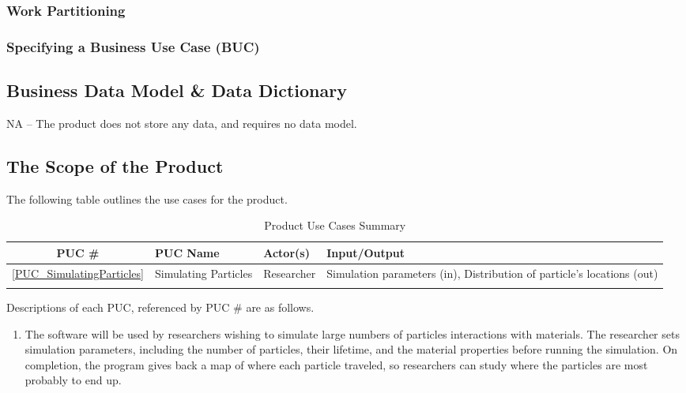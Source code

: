 \documentclass[12pt]{article}
\begin{document}
\subsubsection{Work Partitioning}

\subsubsection{Specifying a Business Use Case (BUC)}

\subsection{Business Data Model \& Data Dictionary} %
NA -- The product does not store any data, and requires no data model.

\subsection{The Scope of the Product}
The following table outlines the use cases for the product.

\begin{table}[h]
\centering
\caption{Product Use Cases Summary}
\begin{tabularx}{\textwidth}{c|l|l|X}
\Xhline{2\arrayrulewidth}
\bf PUC \# & \bf PUC Name & Actor(s) & \bf Input/Output\\
\hline
\ref{PUC_SimulatingParticles} & Simulating Particles & Researcher & Simulation parameters (in), Distribution of particle's locations (out)\\
\Xhline{2\arrayrulewidth}
\end{tabularx}
\end{table}

Descriptions of each PUC, referenced by PUC \# are as follows.
\begin{enumerate}
\item \label{PUC_SimulatingParticles} The software will be used by researchers wishing to simulate large numbers of particles interactions with materials. The researcher sets simulation parameters, including the number of particles, their lifetime, and the material properties before running the simulation. On completion, the program gives back a map of where each particle traveled, so researchers can study where the particles are most probably to end up.
\end{enumerate}
\end{document}
